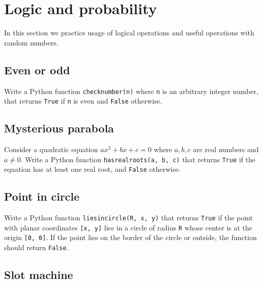 
\section{Logic and probability}

In this section we practice usage of logical operations and useful operations 
with random numbers.


\subsection{Even or odd}

Write a Python function {\tt checknumber(n)} where {\tt n} is an arbitrary 
integer number, that returns {\tt True} if {\tt n} is even and {\tt False}
otherwise.


\subsection{Mysterious parabola}

Consider a quadratic equation $ax^2 + bx + c = 0$ where $a, b, c$ are real numbers 
and $a \not = 0$. Write a Python function 
{\tt hasrealroots(a, b, c)} that returns {\tt True} if the equation has 
at least one real root, and {\tt False} otherwise.


\subsection{Point in circle}

Write a Python function {\tt liesincircle(R, x, y)} that returns {\tt True} if 
the point with planar coordinates {\tt [x, y]} lies in a circle of radius {\tt R}
whose center is at the origin {\tt [0, 0]}. If the point lies on the border of the 
circle or outside, the function should return {\tt False}.


\subsection{Slot machine}

